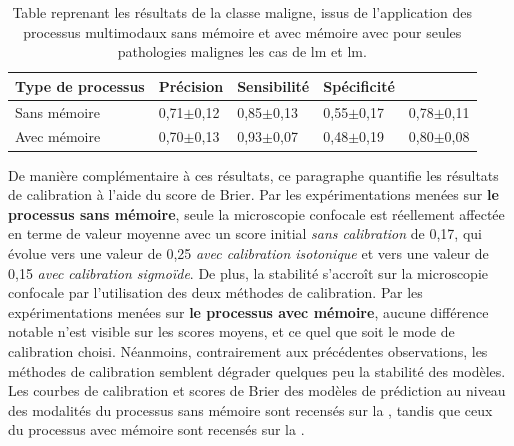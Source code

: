 \begin{table}[H]
    \centering
    \begin{tabular}{lllll}
        \toprule 
        Type de processus   & Précision             & Sensibilité           & Spécificité           & \Fscore{}             \\ \midrule
        Sans mémoire        & 0,71$\pm$0,12 	    & 0,85$\pm$0,13 	    & 0,55$\pm$0,17 	    & 0,78$\pm$0,11         \\ \midrule
        Avec mémoire        & 0,70$\pm$0,13 	    & 0,93$\pm$0,07 	    & 0,48$\pm$0,19 	    & 0,80$\pm$0,08         \\ \bottomrule
    \end{tabular}
    \caption{Table reprenant les résultats de la classe maligne, issus de l'application des processus multimodaux sans mémoire et avec mémoire avec pour seules pathologies malignes les cas de \gls{lm} et \gls{lm}.}
    \label{tab:results_multimodal_process_lm}
\end{table}

De manière complémentaire à ces résultats, ce paragraphe quantifie les résultats de calibration à l'aide du score de Brier. Par les expérimentations menées sur \textbf{le processus sans mémoire}, seule la microscopie confocale est réellement affectée en terme de valeur moyenne avec un score initial \textit{sans calibration} de 0,17, qui évolue vers une valeur de 0,25 \textit{avec calibration isotonique} et vers une valeur de 0,15 \textit{avec calibration sigmoïde}. De plus, la stabilité s'accroît sur la microscopie confocale par l'utilisation des deux méthodes de calibration. Par les expérimentations menées sur \textbf{le processus avec mémoire}, aucune différence notable n'est visible sur les scores moyens, et ce quel que soit le mode de calibration choisi. Néanmoins, contrairement aux précédentes observations, les méthodes de calibration semblent dégrader quelques peu la stabilité des modèles. Les courbes de calibration et scores de Brier des modèles de prédiction au niveau des modalités du processus sans mémoire sont recensés sur la , tandis que ceux du processus avec mémoire sont recensés sur la .\par

